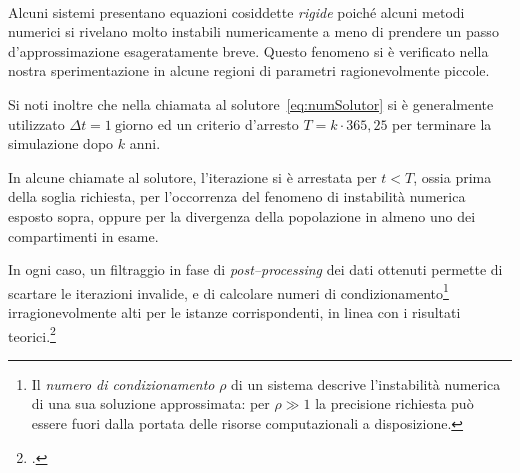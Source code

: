 \paragraph{}
Alcuni sistemi presentano equazioni cosiddette \emph{rigide} poiché alcuni metodi numerici si rivelano
molto instabili numericamente a meno di prendere un passo d'approssimazione esageratamente breve.
Questo fenomeno si è verificato nella nostra sperimentazione in alcune regioni di parametri ragionevolmente piccole.

Si noti inoltre che nella chiamata al solutore~\eqref{eq:numSolutor} si è generalmente utilizzato $\Delta t=1~\text{giorno}$
ed un criterio d'arresto $T=k \cdot 365,25$ per terminare la simulazione dopo $k$ anni.

In alcune chiamate al solutore, l'iterazione si è arrestata per $t < T$, ossia prima della soglia richiesta, per
l'occorrenza del fenomeno di instabilità numerica esposto sopra, oppure per la divergenza della popolazione in almeno
uno dei compartimenti in esame.

In ogni caso, un filtraggio in fase di \emph{post--processing} dei dati ottenuti permette di scartare le iterazioni
invalide, e di calcolare numeri di condizionamento\footnote{Il \emph{numero di condizionamento} $\rho$ di un sistema
descrive l'instabilità numerica di una sua soluzione approssimata: per $\rho \gg 1$ la precisione richiesta può essere
fuori dalla portata delle risorse computazionali a disposizione.}
irragionevolmente alti per le istanze corrispondenti, in linea con i risultati teorici.\footcite{demmel}






